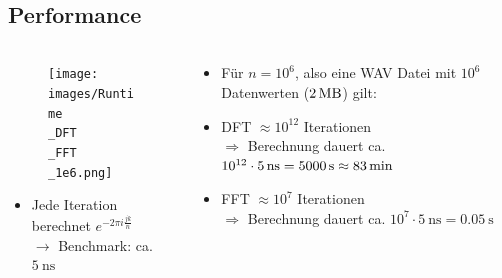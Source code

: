 \subsection{Performance}
\begin{frame}{\insertsection}
	\framesubtitle{\insertsubsection}

	\begin{columns}[T] %
	\begin{column}{0.6\textwidth}
		\begin{figure}
			\centering
			\texttt{[image: images/Runtime\\\_DFT\\\_FFT\\\_1e6.png]}
		\end{figure}
		\begin{itemize}
			\item Jede Iteration berechnet $e^{-2\pi i \frac{jk}{n}}$
			\\ $\rightarrow$ Benchmark: ca. $\SI{5}{\nano\second}$
		\end{itemize}
	\end{column}
	\hfill
	\begin{column}{0.48\textwidth}
		\begin{itemize}
			\vspace{1em}
			\item[] Für $n=10^6$, also eine WAV Datei mit $10^6$ Datenwerten ($\SI{2}{\mega\byte}$) gilt:
			\item DFT $ \approx 10^{12}$ Iterationen
			\\ $\Rightarrow$ Berechnung dauert ca. $10^{12} \cdot \SI{5}{\nano\second} = \SI{5000}{\second} \newline \approx \SI{83}{\minute}$ 
			\item FFT $ \approx 10^{7}$ Iterationen
			\\ $\Rightarrow$ Berechnung dauert ca. $10^{7} \cdot \SI{5}{\nano\second} = \SI{0.05}{\second}$
		\end{itemize}
	\end{column}
	\end{columns}
\end{frame}



